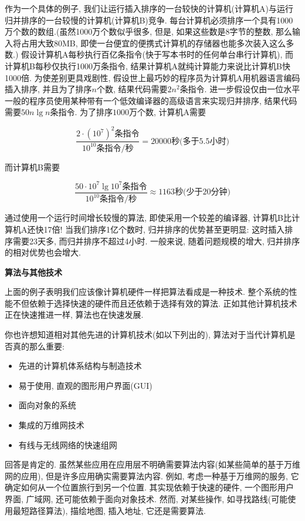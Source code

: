 \documentclass[oneside,10pt]{ctexbook}
\begin{document}
作为一个具体的例子, 我们让运行插入排序的一台较快的计算机(计算机A)与运行归并排序的一台较慢的计算机(计算机B)竞争. 每台计算机必须排序一个具有1000万个数的数组.(虽然1000万个数似乎很多, 但是, 如果这些数是8字节的整数, 那么输入将占用大致80MB, 即使一台便宜的便携式计算机的存储器也能多次装入这么多数.) 假设计算机A每秒执行百亿条指令(快于写本书时的任何单台串行计算机), 而计算机B每秒仅执行1000万条指令, 结果计算机A就纯计算能力来说比计算机B快1000倍. 为使差别更具戏剧性, 假设世上最巧妙的程序员为计算机A用机器语言编码插入排序, 并且为了排序$n$个数, 结果代码需要$2n^2$条指令. 进一步假设仅由一位水平一般的程序员使用某种带有一个低效编译器的高级语言来实现归并排序, 结果代码需要$50n\lg n$条指令. 为了排序$1000$万个数, 计算机A需要

$$
\frac{2\cdot (10^7)^2\text{条指令}}{10^10\text{条指令/秒}} = 20000\text{秒(多于5.5小时)}
$$

而计算机B需要

$$
\frac{50\cdot 10^7\lg{10^7}\text{条指令}}{10^10\text{条指令/秒}} \approx 1163\text{秒(少于20分钟)}
$$

通过使用一个运行时间增长较慢的算法, 即使采用一个较差的编译器, 计算机B比计算机A还快17倍! 当我们排序1亿个数时, 归并排序的优势甚至更明显: 这时插入排序需要23天多, 而归并排序不超过4小时. 一般来说, 随着问题规模的增大, 归并排序的相对优势也会增大.

\textbf{算法与其他技术}

上面的例子表明我们应该像计算机硬件一样把算法看成是一种技术. 整个系统的性能不但依赖于选择快速的硬件而且还依赖于选择有效的算法. 正如其他计算机技术正在快速推进一样, 算法也在快速发展.

你也许想知道相对其他先进的计算机技术(如以下列出的), 算法对于当代计算机是否真的那么重要:

\begin{itemize}
    \item 先进的计算机体系结构与制造技术
    \item 易于使用, 直观的图形用户界面(GUI)
    \item 面向对象的系统
    \item 集成的万维网技术
    \item 有线与无线网络的快速组网
\end{itemize}

回答是肯定的. 虽然某些应用在应用层不明确需要算法内容(如某些简单的基于万维网的应用), 但是许多应用确实需要算法内容. 例如, 考虑一种基于万维网的服务, 它确定如何从一个位置旅行到另一个位置. 其实现依赖于快速的硬件, 一个图形用户界面, 广域网, 还可能依赖于面向对象技术. 然而, 对某些操作, 如寻找路线(可能使用最短路径算法), 描绘地图, 插入地址, 它还是需要算法.
\end{document}
